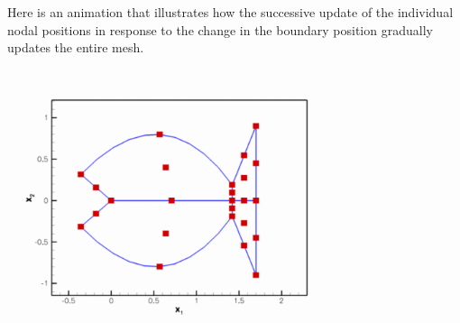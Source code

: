 Here is an animation that illustrates how the successive update of the individual nodal positions in response to the change in the boundary position gradually updates the entire mesh.

 
\begin{DoxyImage}
\includegraphics[width=0.75\textwidth]{sparse_node_update}
\end{DoxyImage}




